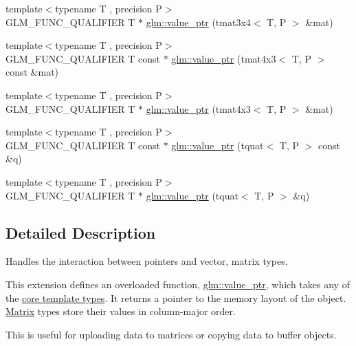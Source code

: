 \begin{DoxyCompactItemize}
\item 
{\footnotesize template$<$typename T , precision P$>$ }\\G\+L\+M\+\_\+\+F\+U\+N\+C\+\_\+\+Q\+U\+A\+L\+I\+F\+I\+E\+R T $\ast$ \hyperlink{group__gtc__type__ptr_gafac7c10d557c3db2f061af0ffe8fc9cf}{glm\+::value\+\_\+ptr} (tmat3x4$<$ T, P $>$ \&mat)
\item 
{\footnotesize template$<$typename T , precision P$>$ }\\G\+L\+M\+\_\+\+F\+U\+N\+C\+\_\+\+Q\+U\+A\+L\+I\+F\+I\+E\+R T const $\ast$ \hyperlink{group__gtc__type__ptr_ga72b0a496d6c190645accac32f48f64bb}{glm\+::value\+\_\+ptr} (tmat4x3$<$ T, P $>$ const \&mat)
\item 
{\footnotesize template$<$typename T , precision P$>$ }\\G\+L\+M\+\_\+\+F\+U\+N\+C\+\_\+\+Q\+U\+A\+L\+I\+F\+I\+E\+R T $\ast$ \hyperlink{group__gtc__type__ptr_gab9cba81cd8a7eb0afc9ac2b9f4fe05ca}{glm\+::value\+\_\+ptr} (tmat4x3$<$ T, P $>$ \&mat)
\item 
{\footnotesize template$<$typename T , precision P$>$ }\\G\+L\+M\+\_\+\+F\+U\+N\+C\+\_\+\+Q\+U\+A\+L\+I\+F\+I\+E\+R T const $\ast$ \hyperlink{group__gtc__type__ptr_ga26a38ff14840b35c57fa937711c5168c}{glm\+::value\+\_\+ptr} (tquat$<$ T, P $>$ const \&q)
\item 
{\footnotesize template$<$typename T , precision P$>$ }\\G\+L\+M\+\_\+\+F\+U\+N\+C\+\_\+\+Q\+U\+A\+L\+I\+F\+I\+E\+R T $\ast$ \hyperlink{group__gtc__type__ptr_ga637414d7a9e8877e66a59f3b3d700898}{glm\+::value\+\_\+ptr} (tquat$<$ T, P $>$ \&q)
\end{DoxyCompactItemize}


\subsection{Detailed Description}
Handles the interaction between pointers and vector, matrix types. 

This extension defines an overloaded function, \hyperlink{group__gtc__type__ptr_gaf019636bb8bd7c9efb7c7ce3bb23bcfc}{glm\+::value\+\_\+ptr}, which takes any of the \hyperlink{group__core__template}{core template types}. It returns a pointer to the memory layout of the object. \hyperlink{class_matrix}{Matrix} types store their values in column-\/major order.

This is useful for uploading data to matrices or copying data to buffer objects.

